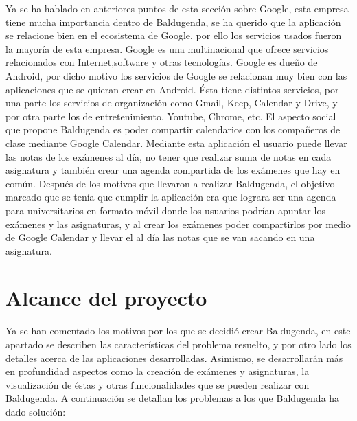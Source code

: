 Ya se ha hablado en anteriores puntos de esta sección sobre Google, esta empresa tiene mucha importancia dentro de Baldugenda, se ha querido que la aplicación se relacione bien en el ecosistema de Google, por ello los servicios usados fueron la mayoría de esta empresa.
Google es una multinacional que ofrece servicios relacionados con Internet,software y otras tecnologías. Google es dueño de Android, por dicho motivo los servicios de Google se relacionan muy bien con las aplicaciones que se quieran crear en Android. Ésta tiene distintos servicios, por una parte los servicios de organización como Gmail, Keep, Calendar y Drive, y por otra parte los de entretenimiento, Youtube, Chrome, etc.
El aspecto social que propone Baldugenda es poder compartir calendarios con los compañeros de clase mediante Google Calendar. Mediante esta aplicación el usuario puede llevar las notas de los exámenes al día, no tener que realizar suma de notas en cada asignatura y también crear una agenda compartida de los exámenes que hay en común.
Después de los motivos que llevaron a realizar Baldugenda, el objetivo marcado que se tenía que cumplir la aplicación era que lograra ser una agenda para universitarios en formato móvil donde los usuarios podrían apuntar los exámenes y las asignaturas, y al crear los exámenes poder compartirlos por medio de Google Calendar y llevar el al día las notas que se van sacando en una asignatura. 
\newpage
\section{Alcance del proyecto}
\label{secc:Alcance}

Ya se han comentado los motivos por los que se decidió crear Baldugenda, en este apartado se describen las características del problema resuelto, y por otro lado los detalles acerca de las aplicaciones desarrolladas.
Asimismo, se desarrollarán más en profundidad aspectos como la creación de exámenes y asignaturas, la visualización de éstas y otras funcionalidades que se pueden realizar con Baldugenda.
A continuación se detallan los problemas a los que Baldugenda ha dado solución:

